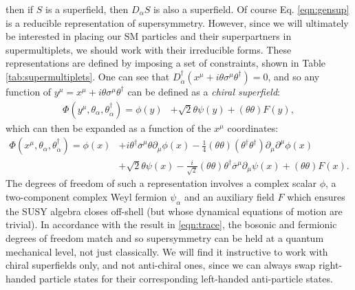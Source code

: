then if $S$ is a superfield, then $D_{\alpha}S$ is also a superfield. Of course Eq. \ref{eqn:gensup} is a reducible representation of supersymmetry. However, since we will ultimately be interested in placing our SM particles and their superpartners in supermultiplets, we should work with their irreducible forms. These representations are defined by imposing a set of constraints, shown in Table \ref{tab:supermultiplets}. One can see that $D^{\dagger}_{\dot{\alpha}}(x^{\mu}+i\theta\sigma^{\mu}\theta^{\dagger})=0$, and so any function of $y^{\mu}=x^{\mu}+i\theta\sigma^{\mu}\theta^{\dagger}$ can be defined as a \textit{chiral superfield}:
\begin{align}
\Phi(y^{\mu},\theta_{\alpha},\theta^{\dagger}_{\dot{\alpha}}) = \phi(y)&+\sqrt{2}\theta\psi(y)+(\theta\theta) F(y),
\end{align}
which can then be expanded as a function of the $x^{\mu}$ coordinates:
\begin{align}
\Phi(x^{\mu},\theta_{\alpha},\theta^{\dagger}_{\dot{\alpha}}) = \phi(x)&+i\theta^{\dagger}\overline{\sigma}^{\mu}\theta\partial_{\mu}\phi(x)-\frac{1}{4}(\theta\theta)(\theta^{\dagger}\theta^{\dagger})\partial_{\mu}\partial^{\mu}\phi(x) \nonumber \\
& + \sqrt{2}\theta \psi(x) - \frac{i}{\sqrt{2}}(\theta\theta)\theta^{\dagger}\overline{\sigma}^{\mu}\partial_{\mu}\psi(x) + (\theta \theta)F(x).
\end{align}
The degrees of freedom of such a representation involves a complex scalar $\phi$, a two-component complex Weyl fermion $\psi_{\alpha}$ and an auxiliary field $F$ which ensures the SUSY algebra closes off-shell (but whose dynamical equations of motion are trivial). In accordance with the result in \ref{eqn:trace}, the bosonic and fermionic degrees of freedom match and so supersymmetry can be held at a quantum mechanical level, not just classically. We will find it instructive to work with chiral superfields only, and not anti-chiral ones, since we can always swap right-handed particle states for their corresponding left-handed anti-particle states.

